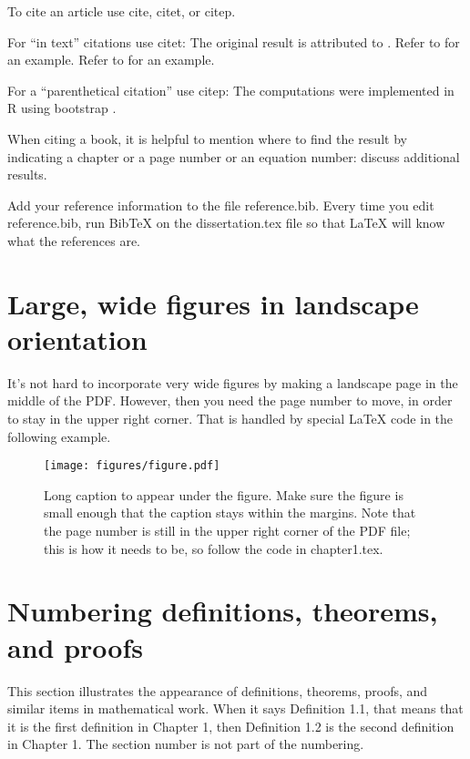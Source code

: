 To cite an article use cite, citet, or citep.

For ``in text'' citations use citet:  The original result is attributed to \citet{vn28}.
Refer to \citet{mardia70} for an example.
Refer to \cite{mardia70} for an example.

For a ``parenthetical citation'' use citep:  The computations were implemented in R \citep{R}
using bootstrap \citep{dh97,et93}.

When citing a book, it is helpful to mention where to find the result by indicating
a chapter or a page number or an equation number:  \citet[Ch.~6]{et93} discuss additional results.

Add your reference information to the file reference.bib.
Every time you edit reference.bib, run BibTeX on the dissertation.tex file so that LaTeX will know what the references are.


\section{Large, wide figures in landscape orientation}

It's not hard to incorporate very wide figures by making a landscape page in the middle of the PDF.  However, then you need the page number to move, in order to stay in the upper right corner.  That is handled by special LaTeX code in the following example.

\begin{landscape}
\thispagestyle{lscape}
\pagestyle{lscape}
  \begin{figure}
    \texttt{[image: figures/figure.pdf]}
    \caption[Short caption for List of Figures]{Long caption to appear under the figure.  Make sure the figure is small enough that the caption stays within the margins.  Note that the page number is still in the upper right corner of the PDF file; this is how it needs to be, so follow the code in chapter1.tex.}
  \end{figure}
\end{landscape}

\section{Numbering definitions, theorems, and proofs}
This section illustrates the appearance of definitions, theorems, proofs, and similar items in mathematical work.
When it says Definition 1.1, that means that it is the first definition in Chapter 1, then Definition 1.2 is the second definition in Chapter 1.
The section number is not part of the numbering.


